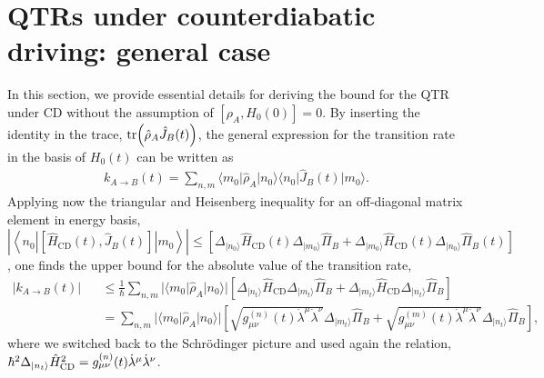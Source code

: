 \documentclass[prl,aps,amssymb,twocolumn,superscriptaddress, notitlepage, longbibliography]{revtex4-2}
\begin{document}
\section{QTRs under counterdiabatic driving: general case}
In this section, we provide essential details for deriving the bound for the QTR under CD without the assumption of $\left[\rho_A,H_0(0)\right]=0$. By inserting the identity in the trace, $\tr(\hat\rho_A\hat J_B(t))$, the general expression for the transition rate in the basis of $H_0(t)$ can be written as
\begin{eqnarray}
    k_{A\rightarrow B}(t)=\sum_{n,m}\langle m_0\lvert\hat\rho_A\rvert n_0\rangle\langle n_0\lvert\hat J_B(t)\rvert m_0\rangle.
\end{eqnarray}
Applying now the triangular and Heisenberg inequality for an off-diagonal matrix element in energy basis, $\left\lvert\left\langle n_0\left\lvert\left[\hat H_\mathrm{CD}(t),\hat J_B(t)\right]\right\rvert m_0\right\rangle\right\rvert\leq\left[\Delta_{\vert n_0\rangle}\hat H_\mathrm{CD}(t)\Delta_{\vert m_0\rangle}\hat\Pi_B+\Delta_{\vert m_0\rangle}\hat H_\mathrm{CD}(t)\Delta_{\vert n_0\rangle}\hat\Pi_B(t)\right]$, one finds the upper bound for the absolute value of the transition rate,
\begin{eqnarray}
    \lvert k_{A\rightarrow B}(t)\rvert&&\leq\frac{1}{\hbar}\sum_{n,m}\lvert\langle m_0\lvert\hat\rho_A\rvert n_0\rangle\rvert\left[\Delta_{\vert n_t\rangle}\hat H_\mathrm{CD}\Delta_{\vert m_t\rangle}\hat\Pi_B+\Delta_{\vert m_t\rangle}\hat H_\mathrm{CD}\Delta_{\vert n_t\rangle}\hat\Pi_B\right]\\
    &&=\sum_{n,m}\lvert\langle m_0\lvert\hat\rho_A\rvert n_0\rangle\rvert\left[\sqrt{g^{(n)}_{\mu\nu}(t)\dot\lambda^\mu\dot\lambda^\nu}\Delta_{\vert m_t\rangle}\hat\Pi_B+\sqrt{g^{(m)}_{\mu\nu}(t)\dot\lambda^\mu\dot\lambda^\nu}\Delta_{\vert n_t\rangle}\hat\Pi_B\right],
\end{eqnarray}
where we switched back to the
Schr\"odinger
picture and used again the relation, $\hbar^2\Delta_{|n_t\rangle}\hat H_{\rm CD}^2=g^{(n)}_{\mu\nu}(t)\dot\lambda^\mu\dot\lambda^\nu$.
\end{document}
